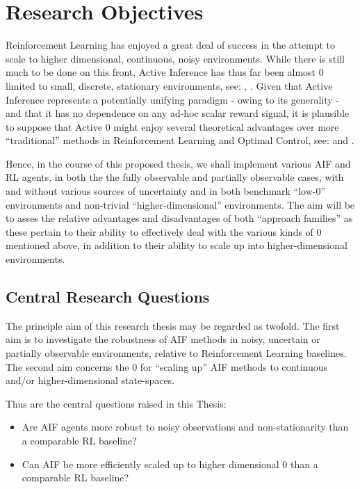 \documentclass[12pt, twoside]{report}
\begin{document}
\section{Research Objectives}
Reinforcement Learning has enjoyed a great deal of success in the attempt to scale to higher dimensional, continuous, noisy environments. While there is still much to be done on this front, Active Inference has thus far been almost 0 limited to small, discrete, stationary environments, see: \textcite{AIF-D}, \textcite{AIF-Cur-Insight}. Given that Active Inference represents a potentially unifying paradigm - owing to its generality - and that it has no dependence on any ad-hoc scalar reward signal, it is plausible to suppose that Active 0 might enjoy several theoretical advantages over more ``traditional'' methods in Reinforcement Learning and Optimal Control, see: \textcite{RL-or-AIF} and \textcite{Friston2012}. 

Hence, in the course of this proposed thesis, we shall implement various AIF and RL agents, in both the the fully observable and partially observable cases, with and without various sources of uncertainty and in both benchmark ``low-0'' environments and non-trivial ``higher-dimensional'' environments. The aim will be to asses the relative advantages and disadvantages of both ``approach families'' as these pertain to their ability to effectively deal with the various kinds of 0 mentioned above, in addition to their ability to scale up into higher-dimensional environments.     


\subsection{Central Research Questions}
The principle aim of this research thesis may be regarded as twofold. The first aim is to investigate the robustness of AIF methods in noisy, uncertain or partially observable environments, relative to Reinforcement Learning baselines. The second aim concerns the 0 for ``scaling up'' AIF methods to continuous and/or higher-dimensional state-spaces. 

Thus are the central questions raised in this Thesis:

\begin{itemize}
\item Are AIF agents more robust to noisy observations and non-stationarity than a comparable RL baseline?
\item Can AIF be more efficiently scaled up to higher dimensional 0 than a comparable RL baseline? 
\end{itemize} 
\end{document}
